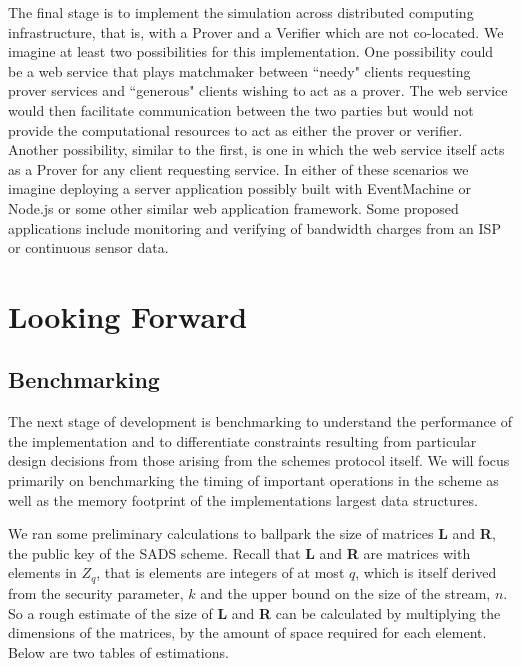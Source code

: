 \documentclass[11pt, letterpaper, oneside]{article}
\begin{document}
	The final stage is to implement the simulation across distributed computing infrastructure, that is, with a Prover and a Verifier which are not co-located.
	We imagine at least two possibilities for this implementation.
	One possibility could be a web service that plays matchmaker between ``needy" clients requesting prover services and ``generous" clients wishing to act as a prover.
	The web service would then facilitate communication between the two parties but would not provide the computational resources to act as either the prover or verifier.
	Another possibility, similar to the first, is one in which the web service itself acts as a Prover for any client requesting service.
	In either of these scenarios we imagine deploying a server application possibly built with EventMachine or Node.js or some other similar web application framework.
	Some proposed applications include monitoring and verifying of bandwidth charges from an ISP or continuous sensor data.

\section{Looking Forward}
\label{sec:forward}

	\subsection{ Benchmarking }

	The next stage of development is benchmarking to understand the performance of the implementation and to differentiate constraints resulting from particular design decisions from those arising from the schemes protocol itself.
	We will focus primarily on benchmarking the timing of important operations in the scheme as well as the memory footprint of the implementations largest data structures.

	We ran some preliminary calculations to ballpark the size of matrices \textbf{L} and \textbf{R}, the public key of the SADS scheme.
	Recall that \textbf{L} and \textbf{R} are matrices with elements in $Z_q$, that is elements are integers of at most $q$, which is itself derived from the security parameter, $k$ and the upper bound on the size of the stream, $n$.
	So a rough estimate of the size of \textbf{L} and \textbf{R} can be calculated by multiplying the dimensions of the matrices, by the amount of space required for each element.
	Below are two tables of estimations.
\end{document}
